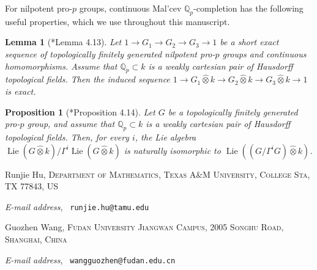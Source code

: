 \documentclass[11pt]{amsart}
\makeatletter
\newtheorem{proposition}[theorem]{Proposition}
\newtheorem{lemma}[theorem]{Lemma}
\theoremstyle{definition}
\numberwithin{equation}{section}
\numberwithin{equation}{section}
\newcommand\QQ{\mathbb{Q}}
\DeclareMathOperator{\Lie}{Lie}
\newcommand{\Addresses}{{%
  \bigskip
  \footnotesize

  Runjie Hu, \textsc{Department of Mathematics, Texas A\&M University,
    College Sta, TX 77843, US}\par\nopagebreak
  \textit{E-mail address}, \texttt{ runjie.hu@tamu.edu}

  Guozhen Wang, \textsc{Fudan University Jiangwan Campus,
2005 Songhu Road, Shanghai, China}\par\nopagebreak
  \textit{E-mail address}, \texttt{ wangguozhen@fudan.edu.cn}
}}
\makeatother
\begin{document}
For nilpotent pro-$p$ groups, continuous Mal'cev $\QQ_p$-completion has the following useful properties, which we use throughout this manuscript.

\begin{lemma}[\cite{Hu-Wang-continuou-Malcev-completion}*{Lemma 4.13}]\label{Lem: Malcev completion preserves exactness of nilpotent groups}
Let $1\rightarrow G_1\rightarrow G_2\rightarrow G_3\rightarrow 1$ be a short exact sequence of topologically finitely generated nilpotent pro-$p$ groups and continuous homomorphisms. Assume that $\QQ_p\subset k$ is a weakly cartesian pair of Hausdorff topological fields. Then the induced sequence $1\rightarrow G_1\widehat{\otimes}k\rightarrow G_2\widehat{\otimes}k\rightarrow G_3\widehat{\otimes}k\rightarrow 1$ is exact.
\end{lemma}

\begin{proposition}[\cite{Hu-Wang-continuou-Malcev-completion}*{Proposition 4.14}]\label{Prop: lower central series of Lie algebra and malcev completion of lower central series}
Let $G$ be a topologically finitely generated pro-$p$ group, and assume that $\QQ_p\subset k$ is a weakly cartesian pair of Hausdorff topological fields. Then, for every $i$,
the Lie algebra $\Lie(G\widehat{\otimes}k)/\Gamma^i\Lie(G\widehat{\otimes}k)$ is naturally isomorphic to $\Lie((G/\Gamma^iG)\widehat{\otimes}k)$.
\end{proposition}




\Addresses
\end{document}
